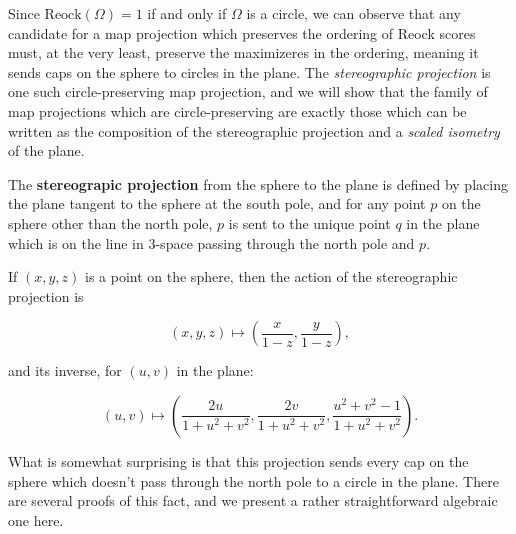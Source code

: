 Since $\mathrm{Reock}(\Omega)=1$ if and only if $\Omega$ is a circle, we can observe that any candidate for a map projection which preserves the ordering of Reock scores must, at the very least, preserve the maximizeres in the ordering, meaning it sends caps on the sphere to circles in the plane.  The \textit{stereographic projection} is one such circle-preserving map projection, and we will show that the family of map projections which are circle-preserving are exactly those which can be written as the composition of the stereographic projection and a \textit{scaled isometry} of the plane.

\begin{definition}
The \textbf{stereograpic projection} from the sphere to the plane is defined by placing the plane tangent to the sphere at the south pole, and for any point $p$ on the sphere other than the north pole, $p$ is sent to the unique point $q$ in the plane which is on the line in 3-space passing through the north pole and $p$.

If $(x,y,z)$ is a point on the sphere, then the action of the stereographic projection is

$$(x,y,z)\mapsto \left(\frac{x}{1-z},\frac{y}{1-z}\right),$$

and its inverse, for $(u,v)$ in the plane:

$$(u,v)\mapsto \left( \frac{2u}{1+u^2+v^2},\frac{2v}{1+u^2+v^2}, \frac{u^2+v^2-1}{1+u^2+v^2}   \right).$$


\end{definition}




What is somewhat surprising is that this projection sends every cap on the sphere which doesn't pass through the north pole to a circle in the plane.  There are several proofs of this fact, and we present a rather straightforward algebraic one here.

